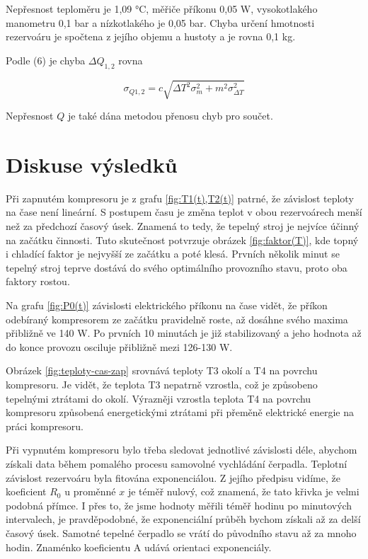 Nepřesnost teploměru je 1,09 °C, měřiče příkonu 0,05 W, vysokotlakého manometru 0,1 bar a nízkotlakého je 0,05 bar. Chyba určení hmotnosti rezervoáru je spočtena z jejího objemu a hustoty a je rovna 0,1 kg.

Podle (6) je chyba \(\Delta Q_{1,2}\) rovna

\begin{equation}
    \sigma_{Q1,2} = c \sqrt{\Delta T^2 \sigma^2_m + m^2 \sigma^2_{\Delta T}}
\end{equation}

Nepřesnost \(Q\) je také dána metodou přenosu chyb pro součet.

\section{Diskuse výsledků}

Při zapnutém kompresoru je z grafu \ref{fig:T1(t),T2(t)} patrné, že závislost teploty na čase není lineární. S postupem času je změna teplot v obou rezervoárech menší než za předchozí časový úsek. Znamená to tedy, že tepelný stroj je nejvíce účinný na začátku činnosti. Tuto skutečnost potvrzuje obrázek  \ref{fig:faktor(T)}, kde topný i chladící faktor je nejvyšší ze začátku a poté klesá. Prvních několik minut se tepelný stroj teprve dostává do svého optimálního provozního stavu, proto oba faktory rostou.

Na grafu \ref{fig:P0(t)} závislosti elektrického příkonu na čase vidět, že příkon odebíraný kompresorem ze začátku pravidelně roste, až dosáhne svého maxima přibližně ve 140 W. Po prvních 10 minutách je již stabilizovaný a jeho hodnota až do konce provozu osciluje přibližně mezi 126-130 W.

Obrázek \ref{fig:teploty-cas-zap} srovnává teploty T3 okolí a T4 na povrchu kompresoru. Je vidět, že teplota T3 nepatrně vzrostla, což je způsobeno tepelnými ztrátami do okolí. Výrazněji vzrostla teplota T4 na povrchu kompresoru způsobená energetickými ztrátami při přeměně elektrické energie na práci kompresoru.

Při vypnutém kompresoru bylo třeba sledovat jednotlivé závislosti déle, abychom získali data během pomalého procesu samovolné vychládání čerpadla. Teplotní závislost rezervoáru byla fitována exponenciálou. Z jejího předpisu vidíme, že koeficient \(R_0\) u proměnné \(x\) je téměř nulový, což znamená, že tato křivka je velmi podobná přímce. I přes to, že jsme hodnoty měřili téměř hodinu po minutových intervalech, je pravděpodobné, že exponenciální průběh bychom získali až za delší časový úsek. Samotné tepelné čerpadlo se vrátí do původního stavu až za mnoho hodin. Znaménko koeficientu A udává orientaci exponenciály.

